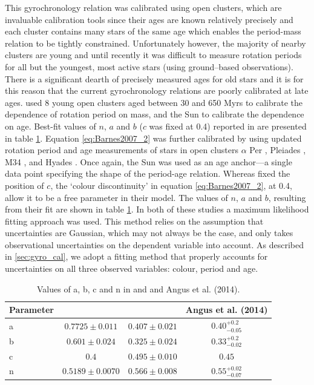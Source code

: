 \documentclass[useAMS, usenatbib]{mn2e}
\newcommand{\gyroa}{0.40}
\newcommand{\aerrp}{0.2}
\newcommand{\aerrm}{0.05}
\newcommand{\gyron}{0.55}
\newcommand{\nerrp}{0.02}
\newcommand{\nerrm}{0.07}
\newcommand{\gyrob}{0.33}
\newcommand{\berrm}{0.02}
\begin{document}
This gyrochronology relation was calibrated using open clusters, which are
invaluable calibration tools since their ages are known relatively precisely
and each cluster contains many stars of the same age which enables the
period-mass relation to be tightly constrained.
Unfortunately however, the majority of nearby clusters are young and until
recently it was difficult to measure rotation periods for all but the
youngest, most active stars (using ground--based observations).
There is a significant dearth of precisely measured ages for old stars and it
is for this reason that the current gyrochronology relations are poorly
calibrated at late ages.
\citet{Barnes2007} used 8 young open clusters aged between 30 and 650 Myrs to
calibrate the dependence of rotation period on mass, and the Sun to calibrate
the dependence on age.
Best-fit values of $n$, $a$ and $b$ ($c$ was fixed at 0.4) reported in
\citet{Barnes2007} are presented in table \ref{tab:constants}.
Equation \ref{eq:Barnes2007_2} was further calibrated by \citet{Mamajek2008}
using updated rotation period and age measurements of stars in open clusters
$\alpha$ Per \citep{Prosser1995}, Pleiades \citep{Prosser1995,
Krishnamurthi1998}, M34 \citep{Meibom2011_M34}, and Hyades \citep[Henry,
private comm.,][]{Radick1987, Radick1995, Prosser1995, Paulson2004}.
Once again, the Sun was used as an age anchor---a single data point specifying
the shape of the period-age relation.
Whereas \citet{Barnes2007} fixed the position of $c$, the `colour
discontinuity' in equation \ref{eq:Barnes2007_2}, at 0.4, \citet{Mamajek2008}
allow it to be a free parameter in their model.
The values of $n$, $a$ and $b$, resulting from their fit are shown in table
\ref{tab:constants}.
In both of these studies a maximum likelihood fitting approach was used.
This method relies on the assumption that uncertainties are Gaussian, which
may not always be the case, and only takes observational uncertainties on the
dependent variable into account.
As described in \textsection \ref{sec:gyro_cal}, we adopt a fitting method
that properly accounts for uncertainties on all three observed variables:
colour, period and age.

\begin{table}
\caption{Values of a, b, c and n in \citet{Barnes2007} and
    \citet{Mamajek2008} and Angus et al. (2014). \label{tab:constants}}
\begin{tabular}{lccc}
\hline\hline
    Parameter & \citet{Barnes2007} & \citet{Mamajek2008} & Angus et al. (2014) \\
    \hline
    a & $0.7725 \pm 0.011$ & $0.407 \pm 0.021$ & $\gyroa^{+\aerrp}_{-\aerrm}$ \\
    b & $0.601 \pm 0.024$ & $0.325 \pm 0.024$ & $\gyrob^{+\aerrp}_{-\berrm}$\\
    c & $0.4$ & $0.495 \pm 0.010$ & $0.45$ \\
    n & $0.5189 \pm 0.0070$ & $0.566 \pm 0.008$ & $\gyron^{+\nerrp}_{-\nerrm}$\\
\hline
\end{tabular}
\end{table}
\end{document}
